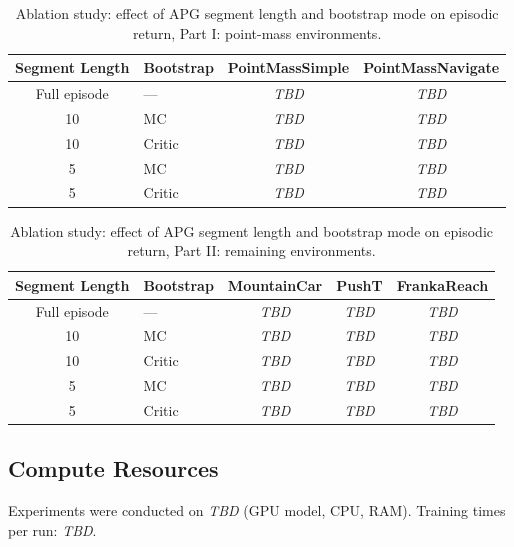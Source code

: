\documentclass[11pt,a4paper]{article}
\newcommand{\tbd}{\textit{TBD}}
\begin{document}
\begin{table}[htbp]
  \centering
  \caption{Ablation study: effect of APG segment length and bootstrap mode on episodic return, Part I: point-mass environments.}
  \label{tab:ablation_seg}
  \small
  \begin{tabular}{@{}clcc@{}}
    \toprule
    \textbf{Segment Length} & \textbf{Bootstrap} & \textbf{PointMassSimple} & \textbf{PointMassNavigate} \\
    \midrule
    Full episode & ---       & \tbd & \tbd \\
    10           & MC        & \tbd & \tbd \\
    10           & Critic    & \tbd & \tbd \\
    5            & MC        & \tbd & \tbd \\
    5            & Critic    & \tbd & \tbd \\
    \bottomrule
  \end{tabular}
\end{table}

\begin{table}[htbp]
  \centering
  \caption{Ablation study: effect of APG segment length and bootstrap mode on episodic return, Part II: remaining environments.}
  \label{tab:ablation_seg_rest}
  \small
  \begin{tabular}{@{}clccc@{}}
    \toprule
    \textbf{Segment Length} & \textbf{Bootstrap} & \textbf{MountainCar} & \textbf{PushT} & \textbf{FrankaReach} \\
    \midrule
    Full episode & ---       & \tbd & \tbd & \tbd \\
    10           & MC        & \tbd & \tbd & \tbd \\
    10           & Critic    & \tbd & \tbd & \tbd \\
    5            & MC        & \tbd & \tbd & \tbd \\
    5            & Critic    & \tbd & \tbd & \tbd \\
    \bottomrule
  \end{tabular}
\end{table}

\subsection{Compute Resources}
\label{sec:compute}

Experiments were conducted on \tbd{} (GPU model, CPU, RAM). Training times per run: \tbd{}.
\end{document}
